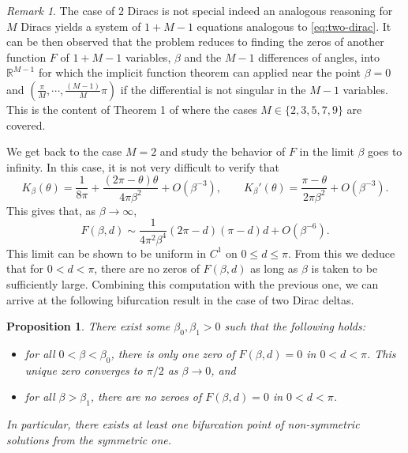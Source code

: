 \documentclass[10pt]{article}
\newtheorem{proposition}[theorem]{Proposition}
\theoremstyle{definition}
\theoremstyle{remark}
\newtheorem{remark}[theorem]{Remark}
\numberwithin{equation}{section}
\newcommand{\0}{\emptyset}
\newcommand{\bt}{\beta}
\newcommand{\tht}{\theta}
\begin{document}
\begin{remark}\label{Rem: contains ckw}
    The case of $2$ Diracs is not special indeed an analogous reasoning for $M$ Diracs yields a system of $1+M-1$ equations analogous to \eqref{eq:two-dirac}. It can be then observed that the problem reduces to finding the zeros of another function $F$ of $1+M-1$ variables, $\beta$ and the $M-1$ differences of angles, into $\mathbb{R}^{M-1}$ for which the implicit function theorem can applied near the point $\beta=0$ and $(\frac{\pi}{M},\cdots,\frac{(M-1)}{M}\pi)$ if the differential is not singular in the $M-1$ variables. This is the content of Theorem 1 of \cite{CKW22} where the cases $M\in \{2,3,5,7,9\}$ are covered.
\end{remark} 

\noindent We get back to the case $M=2$ and study the behavior of $F$ in the limit $\beta$ goes to infinity. In this case, it is not very difficult to verify that \begin{equation*}
    K_{\bt}(\tht) = \frac{1}{8\pi} + \frac{(2\pi-\tht)\tht}{4\pi \bt^2} + O(\bt^{-3}),\qquad K_{\bt}'(\tht) = \frac{\pi-\tht}{2\pi\bt^2} + O(\bt^{-3}).
\end{equation*} This gives that, as $\bt\to\infty$, \begin{equation*}
    F(\bt,d)\sim \frac{1}{4\pi^2 \bt^4} (2\pi-d)(\pi-d)d + O(\bt^{-6}).  
\end{equation*} This limit can be shown to be uniform in $C^1$ on $0\le d \le \pi$. From this we deduce that for $0<d<\pi$, there are no zeros of $F(\bt,d)$ as long as $\bt$ is taken to be sufficiently large. Combining this computation with the previous one, we can arrive at the following bifurcation result in the case of two Dirac deltas. 
\begin{proposition}
    There exist some $\bt_{0},\bt_{1}>0$ such that the following holds: \begin{itemize}
        \item for all $0<\bt<\bt_{0}$, there is only one zero of $F(\bt,d)=0$ in $0<d<\pi$. This unique zero converges to $\pi/2$ as $\bt\to0$, and 
        \item for all $\bt>\bt_{1}$, there are no zeroes of $F(\bt,d)=0$ in $0<d<\pi$.
    \end{itemize} In particular, there exists at least one bifurcation point of non-symmetric solutions from the symmetric one.
\end{proposition}
\end{document}
